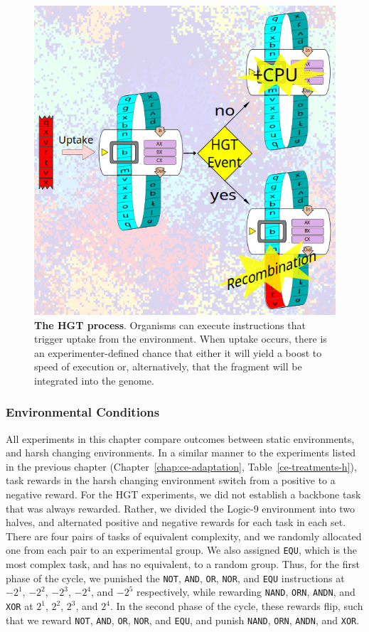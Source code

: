 \documentclass[PhD]{msu-thesis}
\begin{document}
\begin{figure}[h!]
\begin{center}
\includegraphics[width=0.7\columnwidth]{figures/HGT/hgt_figure.png}
\caption{\textbf{The HGT process}. Organisms can execute instructions that trigger uptake from the environment. When uptake occurs, there is an experimenter-defined chance that either it will yield a boost to speed of execution or, alternatively, that the fragment will be integrated into the genome.
}\label{fig:hgtprocess}
\end{center}
\end{figure}

\subsubsection{Environmental Conditions}
All experiments in this chapter compare outcomes between static environments, and harsh changing environments. In a similar manner to the experiments listed in the previous chapter (Chapter~\ref{chap:ce-adaptation}, Table~\ref{ce-treatments-h}), task rewards in the harsh changing environment switch from a positive to a negative reward. For the HGT experiments, we did not establish a backbone task that was always rewarded. Rather, we divided the Logic-9 environment into two halves, and alternated positive and negative rewards for each task in each set. There are four pairs of tasks of equivalent complexity, and we randomly allocated one from each pair to an experimental group. We also assigned \texttt{EQU}, which is the most complex task, and has no equivalent, to a random group. Thus, for the first phase of the cycle, we punished the \texttt{NOT}, \texttt{AND}, \texttt{OR}, \texttt{NOR}, and \texttt{EQU} instructions at $-2^1$, $-2^2$, $-2^3$, $-2^4$, and $-2^5$ respectively, while rewarding \texttt{NAND}, \texttt{ORN}, \texttt{ANDN}, and \texttt{XOR} at $2^1$, $2^2$, $2^3$, and $2^4$. In the second phase of the cycle, these rewards flip, such that we reward \texttt{NOT}, \texttt{AND}, \texttt{OR}, \texttt{NOR}, and \texttt{EQU}, and punish \texttt{NAND}, \texttt{ORN}, \texttt{ANDN}, and \texttt{XOR}.
\end{document}
